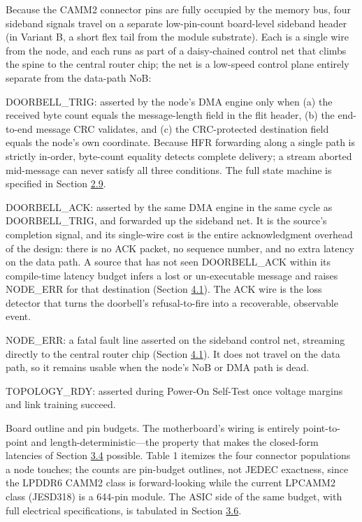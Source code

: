 \documentclass[10pt,twocolumn]{article}
\begin{document}
Because the CAMM2 connector pins are fully occupied by the memory bus, four sideband signals travel on a separate low-pin-count board-level sideband header (in Variant B, a short flex tail from the module substrate). Each is a single wire from the node, and each runs as part of a daisy-chained control net that climbs the spine to the central router chip; the net is a low-speed control plane entirely separate from the data-path NoB:

DOORBELL\_TRIG: asserted by the node's DMA engine only when (a) the received byte count equals the message-length field in the flit header, (b) the end-to-end message CRC validates, and (c) the CRC-protected destination field equals the node's own coordinate. Because HFR forwarding along a single path is strictly in-order, byte-count equality detects complete delivery; a stream aborted mid-message can never satisfy all three conditions. The full state machine is specified in Section \hyperref[sec:2.9]{2.9}.

DOORBELL\_ACK: asserted by the same DMA engine in the same cycle as DOORBELL\_TRIG, and forwarded up the sideband net. It is the source's completion signal, and its single-wire cost is the entire acknowledgment overhead of the design: there is no ACK packet, no sequence number, and no extra latency on the data path. A source that has not seen DOORBELL\_ACK within its compile-time latency budget infers a lost or un-executable message and raises NODE\_ERR for that destination (Section \hyperref[sec:4.1]{4.1}). The ACK wire is the loss detector that turns the doorbell's refusal-to-fire into a recoverable, observable event.

NODE\_ERR: a fatal fault line asserted on the sideband control net, streaming directly to the central router chip (Section \hyperref[sec:4.1]{4.1}). It does not travel on the data path, so it remains usable when the node's NoB or DMA path is dead.

TOPOLOGY\_RDY: asserted during Power-On Self-Test once voltage margins and link training succeed.

Board outline and pin budgets. The motherboard's wiring is entirely point-to-point and length-deterministic---the property that makes the closed-form latencies of Section \hyperref[sec:3.4]{3.4} possible. Table 1 itemizes the four connector populations a node touches; the counts are pin-budget outlines, not JEDEC exactness, since the LPDDR6 CAMM2 class is forward-looking while the current LPCAMM2 class (JESD318) is a 644-pin module\cite{16}. The ASIC side of the same budget, with full electrical specifications, is tabulated in Section \hyperref[sec:3.6]{3.6}.
\end{document}
